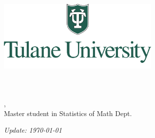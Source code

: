 \begin{titlepage}
	\begin{center}
		
		\includegraphics[width=0.6\textwidth]{Tulane.png}\\[1cm]

		\textsc{\Huge \CN}\\[0.5cm]
		\textsc{\large \Pf}\\[1.0cm]

		\textsc{\LARGE \Ti}\\[0.5cm]
		\textsc{\large \LN, \FN}\\
		{Master student in Statistics of Math Dept.}

		\vfill

		{\Large \emph{Update: \today}}

	\end{center}
\end{titlepage}

\tableofcontents
\setcounter{page}{0}